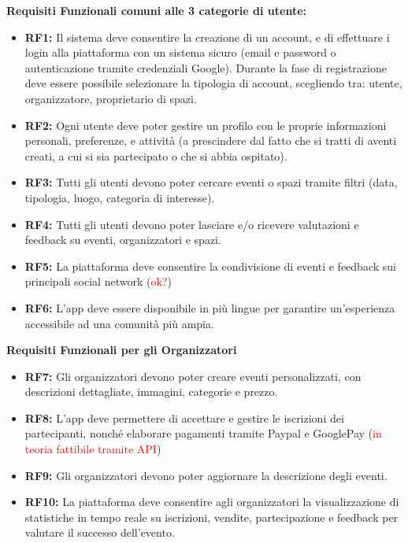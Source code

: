 \documentclass[9pt]{extarticle}
\begin{document}
\textbf{Requisiti Funzionali comuni alle 3 categorie di utente:}
\begin{itemize}
	\item \textbf{RF1:} Il sistema deve consentire la creazione di un account, e di effettuare i login alla piattaforma con un sistema sicuro (email e password o autenticazione tramite credenziali Google). Durante la fase di registrazione deve essere possibile selezionare la tipologia di account, scegliendo tra: utente, organizzatore, proprietario di spazi.
	\item \textbf{RF2:} Ogni utente deve poter gestire un profilo con le proprie informazioni personali, preferenze, e attività (a prescindere dal fatto che si tratti di aventi creati, a cui si sia partecipato o che si abbia ospitato).
	\item \textbf{RF3:} Tutti gli utenti devono poter cercare eventi o spazi tramite filtri (data, tipologia, luogo, categoria di interesse).
	\item \textbf{RF4:} Tutti gli utenti devono poter lasciare e/o ricevere valutazioni e feedback su eventi, organizzatori e spazi.
	\item \textbf{RF5:} La piattaforma deve consentire la condivisione di eventi e feedback sui principali social network (\textcolor{red}{ok?})
	\item \textbf{RF6:} L'app deve essere disponibile in più lingue per garantire un'esperienza accessibile ad una comunità più ampia.
\end{itemize}



\textbf{Requisiti Funzionali per gli Organizzatori}
\begin{itemize}
	\item \textbf{RF7:} Gli organizzatori devono poter creare eventi personalizzati, con descrizioni dettagliate, immagini, categorie e prezzo.
	\item \textbf{RF8:} L’app deve permettere di accettare e gestire le iscrizioni dei partecipanti, nonché elaborare pagamenti tramite Paypal e GooglePay (\textcolor{red}{in teoria fattibile tramite API})
	\item \textbf{RF9:} Gli organizzatori devono poter aggiornare la descrizione degli eventi.
	\item \textbf{RF10:} La piattaforma deve consentire agli organizzatori la visualizzazione di statistiche in tempo reale su iscrizioni, vendite, partecipazione e feedback per valutare il successo dell’evento.
\end{itemize}
\end{document}
